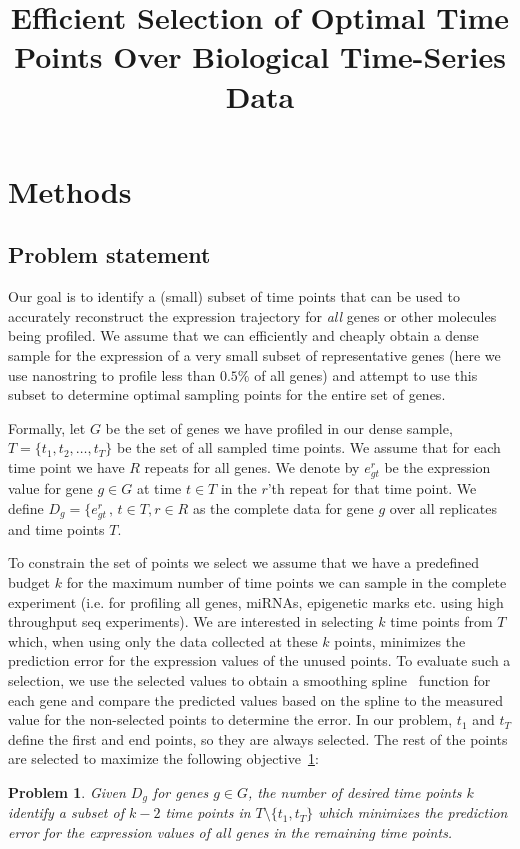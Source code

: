 \documentclass[10pt]{article}
\newtheorem{problem}{Problem}
\begin{document}
\title{Efficient Selection of Optimal Time Points Over Biological Time-Series Data}
\date{}

\maketitle

\section{Methods}

\subsection{Problem statement}
Our goal is to identify a (small) subset of time points that can be
used to accurately reconstruct the expression trajectory for {\em
all} genes or other molecules being profiled. We assume that we can
efficiently and cheaply obtain a dense sample for the expression of
a very small subset of representative genes (here we use nanostring
to profile less than $0.5\%$ of all genes) and attempt to use this
subset to determine optimal sampling points for the entire set of
genes.

Formally, let $G$ be the set of genes we have profiled in our dense
sample, $T = \{t_{1}, t_{2}, \ldots, t_{T}\}$ be the set of all
sampled time points. We assume that for each time point we have $R$
repeats for all genes. We denote by $e_{gt}^{r}$ be the expression
value for gene $g \in G$ at time $t \in T$ in the $r$'th repeat for
that time point. We define $D_{g} = \{e_{gt}^{r}\,,\, t \in T, r \in
R$ as the complete data for gene $g$ over all replicates and time
points $T$.

To constrain the set of points we select we assume that we have a
predefined budget $k$ for the maximum number of time points we can
sample in the complete experiment (i.e. for profiling all genes, miRNAs, epigenetic marks etc. using high throughput seq
experiments). We are interested in selecting $k$ time points from
$T$ which, when using only the data collected at these $k$ points,
minimizes the prediction error for the expression values of the
unused points. To evaluate such a selection, we use the selected
values to obtain a smoothing spline~\cite{deboor, bar2003,
wahba1990} function for each gene and compare the predicted values
based on the spline to the measured value for the non-selected
points to determine the error. In our problem, $t_{1}$ and $t_{T}$
define the first and end points, so they are always selected. The
rest of the points are selected to maximize the following
objective~\ref{prob:prob1}:
%
\begin{problem}\label{prob:prob1}
Given $D_{g}$ for genes $g \in G$, the number of desired time points
$k$ identify a subset of $k-2$ time points in $T \setminus \{t_{1},
t_{T}\}$ which minimizes the prediction error for the expression
values of all genes in the remaining time points.
\end{problem}
\end{document}
